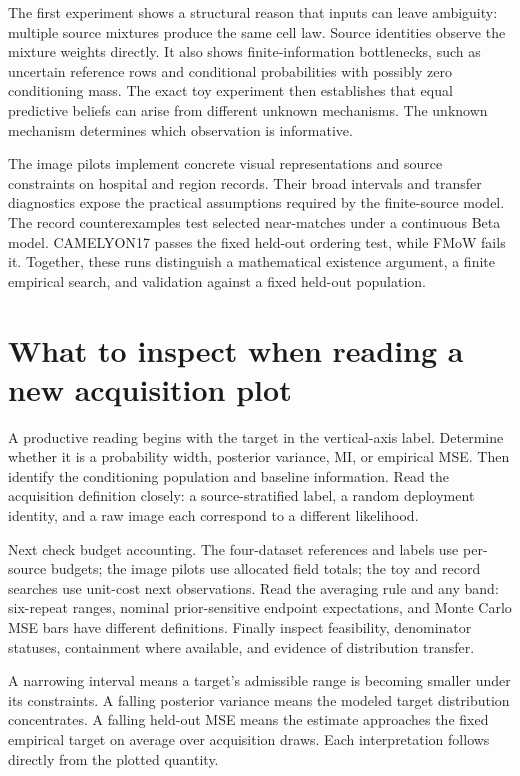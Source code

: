 \documentclass[11pt,a4paper]{report}
\begin{document}
The first experiment shows a structural reason that inputs can leave ambiguity: multiple source mixtures produce the same cell law. Source identities observe the mixture weights directly. It also shows finite-information bottlenecks, such as uncertain reference rows and conditional probabilities with possibly zero conditioning mass. The exact toy experiment then establishes that equal predictive beliefs can arise from different unknown mechanisms. The unknown mechanism determines which observation is informative.

The image pilots implement concrete visual representations and source constraints on hospital and region records. Their broad intervals and transfer diagnostics expose the practical assumptions required by the finite-source model. The record counterexamples test selected near-matches under a continuous Beta model. CAMELYON17 passes the fixed held-out ordering test, while FMoW fails it. Together, these runs distinguish a mathematical existence argument, a finite empirical search, and validation against a fixed held-out population.

\section{What to inspect when reading a new acquisition plot}
A productive reading begins with the target in the vertical-axis label. Determine whether it is a probability width, posterior variance, MI, or empirical MSE. Then identify the conditioning population and baseline information. Read the acquisition definition closely: a source-stratified label, a random deployment identity, and a raw image each correspond to a different likelihood.

Next check budget accounting. The four-dataset references and labels use per-source budgets; the image pilots use allocated field totals; the toy and record searches use unit-cost next observations. Read the averaging rule and any band: six-repeat ranges, nominal prior-sensitive endpoint expectations, and Monte Carlo MSE bars have different definitions. Finally inspect feasibility, denominator statuses, containment where available, and evidence of distribution transfer.

A narrowing interval means a target's admissible range is becoming smaller under its constraints. A falling posterior variance means the modeled target distribution concentrates. A falling held-out MSE means the estimate approaches the fixed empirical target on average over acquisition draws. Each interpretation follows directly from the plotted quantity.
\end{document}
